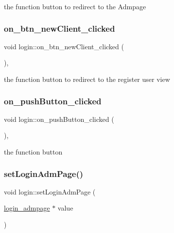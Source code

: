 the function button to redirect to the Admpage 

\mbox{\label{classlogin_aad5cd482a25f3c951bd5ecf1d12bb1a5}} 
\subsubsection{\texorpdfstring{on\+\_\+btn\+\_\+new\+Client\+\_\+clicked}{on\_btn\_newClient\_clicked}}
{\footnotesize\ttfamily void login\+::on\+\_\+btn\+\_\+new\+Client\+\_\+clicked (\begin{DoxyParamCaption}{ }\end{DoxyParamCaption})\hspace{0.3cm}{\ttfamily [private]}, {\ttfamily [slot]}}



the function button to redirect to the register user view 

\mbox{\label{classlogin_a443d3a41176756820926a515cbd4cd1f}} 
\subsubsection{\texorpdfstring{on\+\_\+push\+Button\+\_\+clicked}{on\_pushButton\_clicked}}
{\footnotesize\ttfamily void login\+::on\+\_\+push\+Button\+\_\+clicked (\begin{DoxyParamCaption}{ }\end{DoxyParamCaption})\hspace{0.3cm}{\ttfamily [private]}, {\ttfamily [slot]}}



the function button 

\mbox{\label{classlogin_a30d139e6c1e4eeea8c23776e23cc8e47}} 
\subsubsection{\texorpdfstring{set\+Login\+Adm\+Page()}{setLoginAdmPage()}}
{\footnotesize\ttfamily void login\+::set\+Login\+Adm\+Page (\begin{DoxyParamCaption}\item[{\hyperlink{classlogin__admpage}{login\+\_\+admpage} $\ast$}]{value }\end{DoxyParamCaption})}



